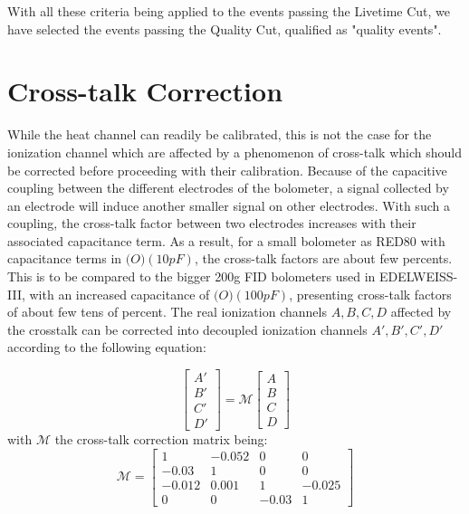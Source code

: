 With all these criteria being applied to the events passing the Livetime Cut, we have selected the events passing the Quality Cut, qualified as "quality events".


\section{Cross-talk Correction}
\label{par:crosstalk}
While the heat channel can readily be calibrated, this is not the case for the ionization channel which are affected by a phenomenon of cross-talk which should be corrected before proceeding with their calibration.
Because of the capacitive coupling between the different electrodes of the bolometer, a signal collected by an electrode will induce another smaller signal on other electrodes. With such a coupling, the cross-talk factor between two electrodes increases with their associated capacitance term.
As a result, for a small bolometer as RED80 with capacitance terms in $\mathcal(O)(10 pF)$, the cross-talk factors are about few percents. This is to be compared to the bigger 200g FID bolometers used in EDELWEISS-III, with an increased capacitance of $\mathcal(O)(100 pF)$, presenting cross-talk factors of about few tens of percent.
The real ionization channels $A,B,C,D$ affected by the crosstalk can be corrected into decoupled ionization channels $A', B', C', D'$ according to the following equation:

\begin{equation}
	\left[\begin{array}{c}
	A' \\ 
	B' \\ 
	C' \\ 
	D'
	\end{array}\right]
	=
	\mathcal{M}
	\left[\begin{array}{c}
	A \\ 
	B \\ 
	C \\ 
	D
	\end{array} \right]
\end{equation}
with $\mathcal{M}$ the cross-talk correction matrix being:
\begin{equation}
	\mathcal{M}
	=
	\left[\begin{array}{cccc}
	1 & -0.052 & 0 & 0 \\ 
	-0.03 & 1 & 0 & 0 \\ 
	-0.012 & 0.001 & 1 & -0.025 \\ 
	0 & 0 & -0.03 & 1
	\end{array}\right]
\end{equation}

